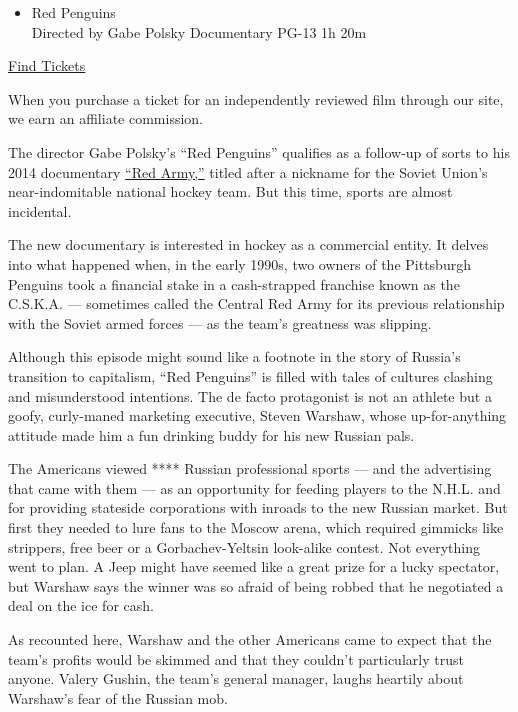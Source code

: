 \begin{itemize}
\tightlist
\item
  Red Penguins\\
  Directed by Gabe Polsky Documentary PG-13 1h 20m
\end{itemize}

\href{https://www.imdb.com/showtimes/title/tt10779084?ref_=ref_ext_NYT}{Find
Tickets}

When you purchase a ticket for an independently reviewed film through
our site, we earn an affiliate commission.

The director Gabe Polsky's ``Red Penguins'' qualifies as a follow-up of
sorts to his 2014 documentary
\href{https://www.nytimes3xbfgragh.onion/2014/11/14/movies/red-army-the-rise-and-fall-of-a-soviet-hockey-dynasty.html}{``Red
Army,''} titled after a nickname for the Soviet Union's near-indomitable
national hockey team. But this time, sports are almost incidental.

The new documentary is interested in hockey as a commercial entity. It
delves into what happened when, in the early 1990s, two owners of the
Pittsburgh Penguins took a financial stake in a cash-strapped franchise
known as the C.S.K.A. --- sometimes called the Central Red Army for its
previous relationship with the Soviet armed forces --- as the team's
greatness was slipping.

Although this episode might sound like a footnote in the story of
Russia's transition to capitalism, ``Red Penguins'' is filled with tales
of cultures clashing and misunderstood intentions. The de facto
protagonist is not an athlete but a goofy, curly-maned marketing
executive, Steven Warshaw, whose up-for-anything attitude made him a fun
drinking buddy for his new Russian pals.

The Americans viewed **** Russian professional sports --- and the
advertising that came with them --- as an opportunity for feeding
players to the N.H.L. and for providing stateside corporations with
inroads to the new Russian market. But first they needed to lure fans to
the Moscow arena, which required gimmicks like strippers, free beer or a
Gorbachev-Yeltsin look-alike contest. Not everything went to plan. A
Jeep might have seemed like a great prize for a lucky spectator, but
Warshaw says the winner was so afraid of being robbed that he negotiated
a deal on the ice for cash.

As recounted here, Warshaw and the other Americans came to expect that
the team's profits would be skimmed and that they couldn't particularly
trust anyone. Valery Gushin, the team's general manager, laughs heartily
about Warshaw's fear of the Russian mob.

